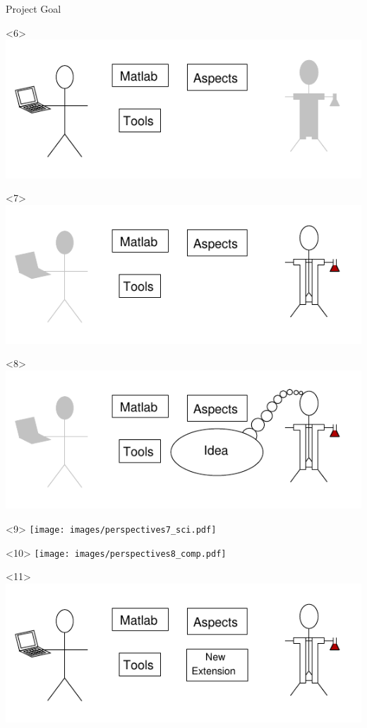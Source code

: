 \begin{frame}{Project Goal}
\begin{onlyenv}
    \end{onlyenv}
    \begin{onlyenv}<6>
      \includegraphics{images/perspectives4_comp.pdf}
    \end{onlyenv}
    \begin{onlyenv}<7>
      \includegraphics{images/perspectives5_sci.pdf}
    \end{onlyenv}
    \begin{onlyenv}<8>
      \includegraphics{images/perspectives6_sci.pdf}
    \end{onlyenv}
    \begin{onlyenv}<9>
      \texttt{[image: images/perspectives7\_sci.pdf]}
    \end{onlyenv}
    \begin{onlyenv}<10>
      \texttt{[image: images/perspectives8\_comp.pdf]}
    \end{onlyenv}
    \begin{onlyenv}<11>
      \includegraphics{images/perspectives_base.pdf}
    \end{onlyenv}
\end{frame}

